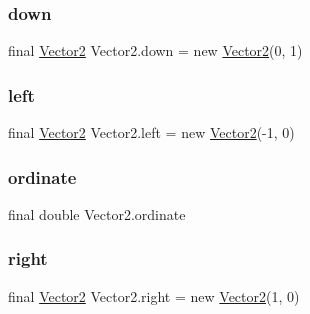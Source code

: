 \mbox{\label{class_vector2_a46688c121909b9272b28515914262cae}} 
\subsubsection{\texorpdfstring{down}{down}}
{\footnotesize\ttfamily final \mbox{\hyperlink{class_vector2}{Vector2}} Vector2.\+down = new \mbox{\hyperlink{class_vector2}{Vector2}}(0, 1)\hspace{0.3cm}{\ttfamily [static]}}

\mbox{\label{class_vector2_a11bfafbd9c5cdba775129514ea177e85}} 
\subsubsection{\texorpdfstring{left}{left}}
{\footnotesize\ttfamily final \mbox{\hyperlink{class_vector2}{Vector2}} Vector2.\+left = new \mbox{\hyperlink{class_vector2}{Vector2}}(-\/1, 0)\hspace{0.3cm}{\ttfamily [static]}}

\mbox{\label{class_vector2_a11433891ace979aadcb1c8c8612c29a3}} 
\subsubsection{\texorpdfstring{ordinate}{ordinate}}
{\footnotesize\ttfamily final double Vector2.\+ordinate}

\mbox{\label{class_vector2_a3e64ea2bc84a81a281a9d938a459bfc8}} 
\subsubsection{\texorpdfstring{right}{right}}
{\footnotesize\ttfamily final \mbox{\hyperlink{class_vector2}{Vector2}} Vector2.\+right = new \mbox{\hyperlink{class_vector2}{Vector2}}(1, 0)\hspace{0.3cm}{\ttfamily [static]}}

\mbox{\label{class_vector2_a46039dbadb78f36a65d9097d79f17e0f}} 
